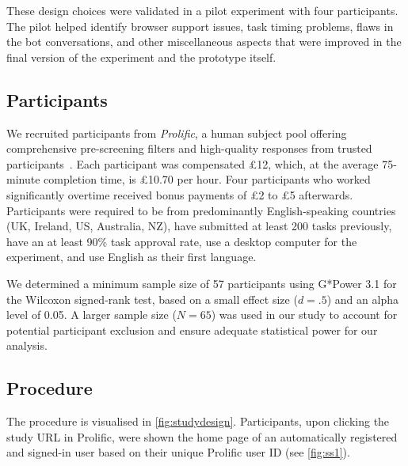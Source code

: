 \documentclass[sigconf]{acmart}
\begin{document}
These design choices were validated in a pilot experiment with four participants. The pilot helped identify browser support issues, task timing problems, flaws in the bot conversations, and other miscellaneous aspects that were improved in the final version of the experiment and the prototype itself.

\subsection{Participants}
We recruited participants from \textit{Prolific}, a human subject pool offering comprehensive pre-screening filters and high-quality responses from trusted participants~\cite{Peer2017BeyondResearch, Douglas2023DataSONA}.
Each participant was compensated £12, which, at the average 75-minute completion time, is £10.70 per hour. Four participants who worked significantly overtime received bonus payments of £2 to £5 afterwards.
Participants were required to be from predominantly English-speaking countries (UK, Ireland, US, Australia, NZ), have submitted at least 200 tasks previously, have an at least 90\% task approval rate, use a desktop computer for the experiment, and use English as their first language.

We determined a minimum sample size of 57 participants using G*Power 3.1 for the Wilcoxon signed-rank test, based on a small effect size ($d = .5$) and an alpha level of 0.05. A larger sample size ($N = 65$) was used in our study to account for potential participant exclusion and ensure adequate statistical power for our analysis. 

\subsection{Procedure}
\label{sec:procedure}

The procedure is visualised in \autoref{fig:studydesign}.
Participants, upon clicking the study URL in Prolific, were shown the home page of an automatically registered and signed-in user based on their unique Prolific user ID (see \autoref{fig:ss1}). 
\end{document}
